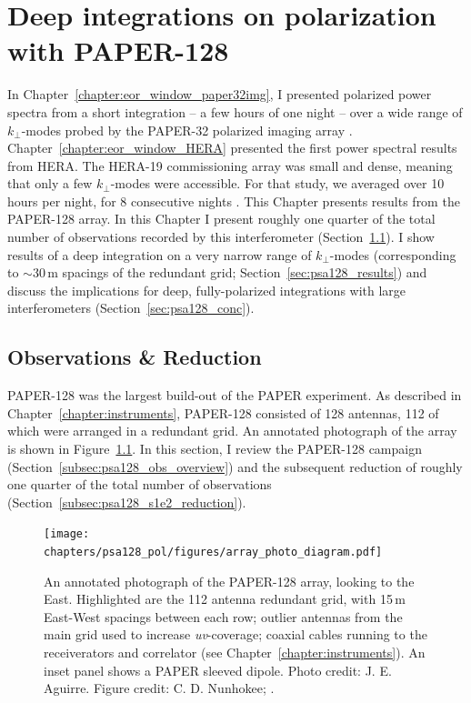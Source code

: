 \chapter{Deep integrations on polarization with PAPER-128}
\label{chapter:eor_window_psa128}

In Chapter~\ref{chapter:eor_window_paper32img}, I presented polarized power spectra from a short integration -- a few hours of one night -- over a wide range of $k_{\perp}$-modes probed by the PAPER-32 polarized imaging array \citep{Kohn.16}. Chapter~\ref{chapter:eor_window_HERA} presented the first power spectral results from HERA. The HERA-19 commissioning array was small and dense, meaning that only a few $k_{\perp}$-modes were accessible. For that study, we averaged over 10 hours per night, for 8 consecutive nights \citep{Kohn.18}. This Chapter presents results from the PAPER-128 array. In this Chapter I present roughly one quarter of the total number of observations recorded by this interferometer (Section~\ref{sec:psa128_obs}). I show results of a deep integration on a very narrow range of $k_{\perp}$-modes (corresponding to $\sim$30\,m spacings of the redundant grid; Section~\ref{sec:psa128_results}) and discuss the implications for deep, fully-polarized integrations with large interferometers (Section~\ref{sec:psa128_conc}).

\section{Observations \& Reduction}
\label{sec:psa128_obs}
 
PAPER-128 was the largest build-out of the PAPER experiment. As described in Chapter~\ref{chapter:instruments},  PAPER-128 consisted of 128 antennas, 112 of which were arranged in a redundant grid. An annotated photograph of the array is shown in Figure~\ref{fig:psa128photo}. In this section, I review the PAPER-128 campaign (Section~\ref{subsec:psa128_obs_overview}) and the subsequent reduction of roughly one quarter of the total number of observations (Section~\ref{subsec:psa128_s1e2_reduction}).

\begin{figure}
\texttt{[image: chapters/psa128\_pol/figures/array\_photo\_diagram.pdf]}
\caption[An annotated photograph of the PAPER-128 array.]{An annotated photograph of the PAPER-128 array, looking to the East. Highlighted are the 112 antenna redundant grid, with 15\,m East-West spacings between each row; outlier antennas from the main grid used to increase \textit{uv}-coverage; coaxial cables running to the receiverators and correlator (see Chapter~\ref{chapter:instruments}). An inset panel shows a PAPER sleeved dipole. Photo credit: J. E. Aguirre. Figure credit: C. D. Nunhokee; \citep{Nunhokee_thesis}.}
\label{fig:psa128photo}
\end{figure}

